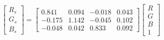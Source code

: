 \begin{equation}
\begin{bmatrix}
  R_s \\ G_s \\ B_s 
\end{bmatrix}=
\left[\begin{matrix}0.841 & 0.094 & -0.018 & 0.043\\ 
-0.175 & 1.142 & -0.045 & 0.102\\ 
-0.048 & 0.042 & 0.833 & 0.092\end{matrix}\right]
\begin{bmatrix}
  R \\ G \\ B \\ 1 
\end{bmatrix}
\end{equation}
